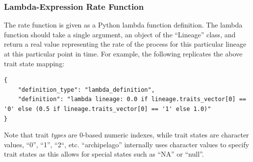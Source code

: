 \documentclass[11pt,openany]{memoir} %
\begin{document}
\subsubsection{Lambda-Expression Rate Function}
The rate function is given as a Python lambda function definition.
The lambda function should take a single argument, an object of the ``Lineage'' class, and return a real value representing the rate of the process for this particular lineage at this particular point in time.
For example, the following replicates the above trait state mapping:
\begin{lstlisting}
{
    "definition_type": "lambda_definition",
    "definition": "lambda lineage: 0.0 if lineage.traits_vector[0] == '0' else (0.5 if lineage.traits_vector[0] == '1' else 1.0)"
}
\end{lstlisting}
Note that trait \textit{types} are 0-based numeric indexes, while trait states are character values, ``0'', ``1'', ``2``, etc. ``archipelago'' internally uses character values to specify trait states as this allows for special states such as ``NA'' or ``null''.
\end{document}
